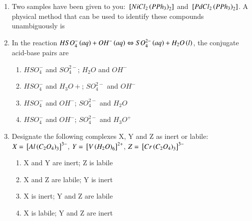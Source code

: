 \documentclass[journal,12pt,onecolumn]{IEEEtran}
\theoremstyle{remark}
\begin{document}
\begin{enumerate}[resume]
\item Two samples have been given to you: ${}\left[NiCl_2\left(PPh_3\right)_2\right]$ and ${}\left[PdCl_2\left(PPh_3\right)_2\right]$.
 A physical method that can be used to identify these compounds unambiguously is
    \begin{enumerate}
        \hfill{}
    \end{enumerate}



\item In the reaction $HSO_4^{-}\left(aq\right) + OH^{-}\left(aq\right) \Leftrightarrow SO_4^{2-}\left(aq\right) + H_2O\left(l\right)$, the conjugate acid-base pairs 
 are
    \begin{enumerate}
        \item $HSO_4^{-}$ and $SO_4^{2-}$;
 $H_2O$ and $OH^{-}$
        \item $HSO_4^{-}$ and $H_3O+$;
 $SO_4^{2-}$ and $OH^{-}$
        \item $HSO_4^{-}$ and $OH^{-}$;
 $SO_4^{2-}$ and $H_2O$
        \item $HSO_4^{-}$ and $OH^{-}$;
 $SO_4^{2-}$ and $H_3O^+$
        \hfill{}
    \end{enumerate}



\item Designate the following complexes X, Y and Z as inert or labile: \\
    $X = {}\left[Al\left(C_2O_4\right)_3\right]^{3-}$, $Y = {}\left[V\left(H_2O\right)_6\right]^{2+}$, $Z = {}\left[Cr\left(C_2O_4\right)_3\right]^{3-}$
    \begin{enumerate}
        \item X and Y are inert;
 Z is labile
        \item X and Z are labile;
 Y is inert
        \item X is inert;
 Y and Z are labile
        \item X is labile;
 Y and Z are inert
        \hfill{}
    \end{enumerate}




\end{enumerate}
\end{document}
